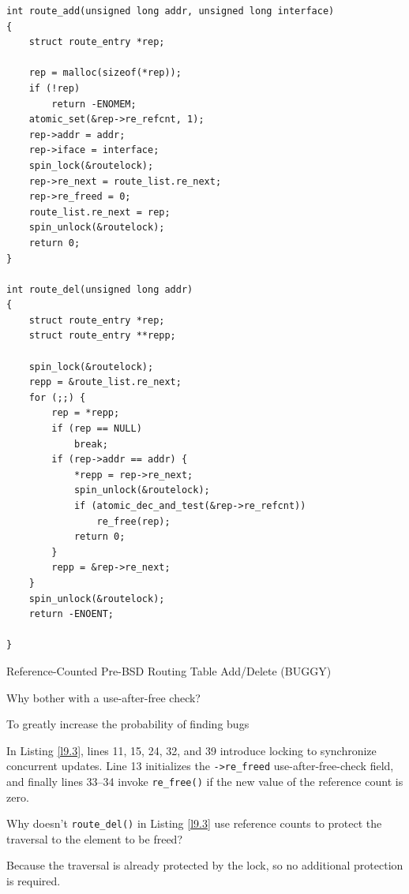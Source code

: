 \documentclass[11pt]{article}
\begin{document}
\begin{listing}[htbp]
\begin{verbatim}
int route_add(unsigned long addr, unsigned long interface)
{
    struct route_entry *rep;

    rep = malloc(sizeof(*rep));
    if (!rep)
        return -ENOMEM;
    atomic_set(&rep->re_refcnt, 1);
    rep->addr = addr;
    rep->iface = interface;
    spin_lock(&routelock);
    rep->re_next = route_list.re_next;
    rep->re_freed = 0;
    route_list.re_next = rep;
    spin_unlock(&routelock);
    return 0;
}

int route_del(unsigned long addr)
{
    struct route_entry *rep;
    struct route_entry **repp;

    spin_lock(&routelock);
    repp = &route_list.re_next;
    for (;;) {
        rep = *repp;
        if (rep == NULL)
            break;
        if (rep->addr == addr) {
            *repp = rep->re_next;
            spin_unlock(&routelock);
            if (atomic_dec_and_test(&rep->re_refcnt))
                re_free(rep);
            return 0;
        }
        repp = &rep->re_next;
    }
    spin_unlock(&routelock);
    return -ENOENT;

}
\end{verbatim}
\caption{\label{l9.3}Reference-Counted Pre-BSD Routing Table Add/Delete (BUGGY)}
\end{listing}

\begin{remark}[]
Why bother with a use-after-free check?

To greatly increase the probability of finding bugs
\end{remark}

In Listing \ref{l9.3}, lines 11, 15, 24, 32, and 39 introduce locking to synchronize concurrent updates.
Line 13 initializes the \texttt{->re\_freed} use-after-free-check field, and finally lines 33–34 invoke
\texttt{re\_free()} if the new value of the reference count is zero.

\begin{remark}[]
Why doesn't \texttt{route\_del()} in Listing \ref{l9.3} use reference counts to protect the traversal to the
element to be freed?

Because the traversal is already protected by the lock, so no additional protection is required.
\end{remark}
\end{document}
